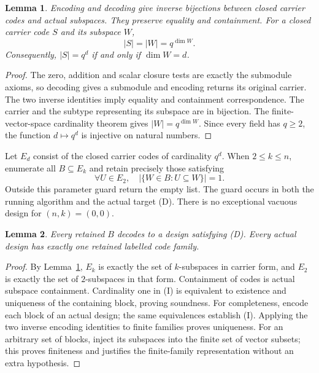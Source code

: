 \documentclass[11pt]{article}
\newtheorem{lemma}{Lemma}
\begin{document}
\begin{lemma}\label{lem:codes}
Encoding and decoding give inverse bijections between closed carrier
codes and actual subspaces. They preserve equality and containment.
For a closed carrier code $S$ and its subspace $W$,
\[ |S|=|W|=q^{\dim W}. \]
Consequently, $|S|=q^d$ if and only if $\dim W=d$.
\end{lemma}
\begin{proof}
The zero, addition and scalar closure tests are exactly the submodule
axioms, so decoding gives a submodule and encoding returns its original
carrier. The two inverse identities imply equality and containment
correspondence. The carrier and the subtype representing its subspace
are in bijection. The finite-vector-space cardinality theorem gives
$|W|=q^{\dim W}$. Since every field has $q\geq2$, the function
$d\mapsto q^d$ is injective on natural numbers.
\end{proof}

Let $E_d$ consist of the closed carrier codes of cardinality $q^d$.
When $2\leq k\leq n$, enumerate all $B\subseteq E_k$ and retain
precisely those satisfying
\begin{equation}
 \forall U\in E_2,\quad
  \bigl|\{W\in B:U\subseteq W\}\bigr|=1.       \tag{I}
\end{equation}
Outside this parameter guard return the empty list. The guard occurs
in both the running algorithm and the actual target \textup{(D)}.
There is no exceptional vacuous design for $(n,k)=(0,0)$.

\begin{lemma}\label{lem:catalogue}
Every retained $B$ decodes to a design satisfying \textup{(D)}.
Every actual design has exactly one retained labelled code family.
\end{lemma}
\begin{proof}
By Lemma~\ref{lem:codes}, $E_k$ is exactly the set of $k$-subspaces
in carrier form, and $E_2$ is exactly the set of $2$-subspaces in
that form. Containment of codes is actual subspace containment.
Cardinality one in \textup{(I)} is equivalent to existence and
uniqueness of the containing block, proving soundness.
For completeness, encode each block of an actual design; the same
equivalences establish \textup{(I)}. Applying the two inverse
encoding identities to finite families proves uniqueness. For an
arbitrary set of blocks, inject its subspaces into the finite set of
vector subsets; this proves finiteness and justifies the finite-family
representation without an extra hypothesis.
\end{proof}
\end{document}
